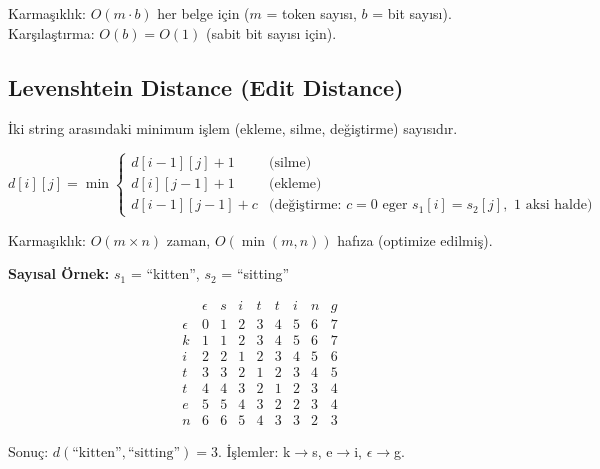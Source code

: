 \noindent
Karma\c{s}{\i}kl{\i}k: $O(m \cdot b)$ her belge i\c{c}in ($m$ = token say{\i}s{\i}, $b$ = bit say{\i}s{\i}). Kar\c{s}{\i}la\c{s}t{\i}rma: $O(b) = O(1)$ (sabit bit say{\i}s{\i} i\c{c}in).


\subsection{Levenshtein Distance (Edit Distance)}
\label{subsec:levenshtein}

\.{I}ki string aras{\i}ndaki minimum i\c{s}lem (ekleme, silme, de\u{g}i\c{s}tirme) say{\i}s{\i}d{\i}r.

\begin{formulbox}
\begin{equation}
d[i][j] = \min \begin{cases}
d[i-1][j] + 1       & \text{(silme)} \\
d[i][j-1] + 1       & \text{(ekleme)} \\
d[i-1][j-1] + c     & \text{(de\u{g}i\c{s}tirme: } c = 0 \text{ eger } s_1[i] = s_2[j], \text{ 1 aksi halde)}
\end{cases}
\label{eq:levenshtein}
\end{equation}

Karma\c{s}{\i}kl{\i}k: $O(m \times n)$ zaman, $O(\min(m, n))$ haf{\i}za (optimize edilmi\c{s}).
\end{formulbox}

\begin{ornek}
\textbf{Say{\i}sal \"{O}rnek:} $s_1$ = ``kitten'', $s_2$ = ``sitting''

\[
\begin{array}{c|cccccccc}
     & \epsilon & s & i & t & t & i & n & g \\
\hline
\epsilon & 0 & 1 & 2 & 3 & 4 & 5 & 6 & 7 \\
k & 1 & 1 & 2 & 3 & 4 & 5 & 6 & 7 \\
i & 2 & 2 & 1 & 2 & 3 & 4 & 5 & 6 \\
t & 3 & 3 & 2 & 1 & 2 & 3 & 4 & 5 \\
t & 4 & 4 & 3 & 2 & 1 & 2 & 3 & 4 \\
e & 5 & 5 & 4 & 3 & 2 & 2 & 3 & 4 \\
n & 6 & 6 & 5 & 4 & 3 & 3 & 2 & 3
\end{array}
\]

Sonu\c{c}: $d(\text{``kitten''}, \text{``sitting''}) = 3$. \.{I}\c{s}lemler: k$\to$s, e$\to$i, $\epsilon \to$g.
\end{ornek}

